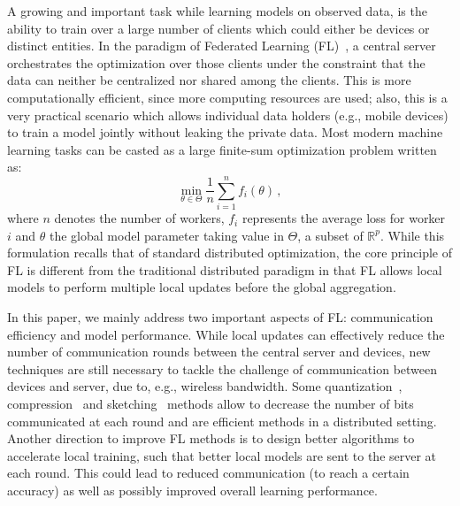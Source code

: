 \documentclass[twoside]{article}
\begin{document}
A growing and important task while learning models on observed data, is the ability to train over a large number of clients which could either be devices or distinct entities.
In the paradigm of Federated Learning (FL)~\citep{konevcny2016federated,mcmahan2017communication}, a central server orchestrates the optimization over those clients under the constraint that the data can neither be centralized nor shared among the clients.
This is more computationally efficient, since more computing resources are used; also, this is a very practical scenario which allows individual data holders (e.g., mobile devices) to train a model jointly without leaking the private data. Most modern machine learning tasks can be casted as a large finite-sum optimization problem written as:
\begin{equation}\label{eq:opt}
\min \limits_{\theta \in \Theta} \frac{1}{n} \sum_{i=1}^n f_i(\theta) \, ,
\end{equation}
where $n$ denotes the number of workers, $f_i$ represents the average loss for worker $i$ and $\theta$ the global model parameter taking value in $\Theta$, a subset of $\mathbb{R}^p$.
While this formulation recalls that of standard distributed optimization, the core principle of FL is different from the traditional distributed paradigm in that FL allows local models to perform multiple local updates before the global aggregation.

In this paper, we mainly address two important aspects of FL: communication efficiency and model performance.
While local updates can effectively reduce the number of communication rounds between the central server and devices, new techniques are still necessary to tackle the challenge of communication between devices and server, due to, e.g., wireless bandwidth.
Some quantization~\citep{alistarh2017qsgd, wangni2018gradient}, compression~\citep{lin2017deep} and sketching~\cite{Proc:Rothchild_ICML20} methods allow to decrease the number of bits communicated at each round and are efficient methods in a distributed setting. Another direction to improve FL methods is to design better algorithms to accelerate local training, such that better local models are sent to the server at each round. This could lead to reduced communication (to reach a certain accuracy) as well as possibly improved overall learning performance.

\end{document}
